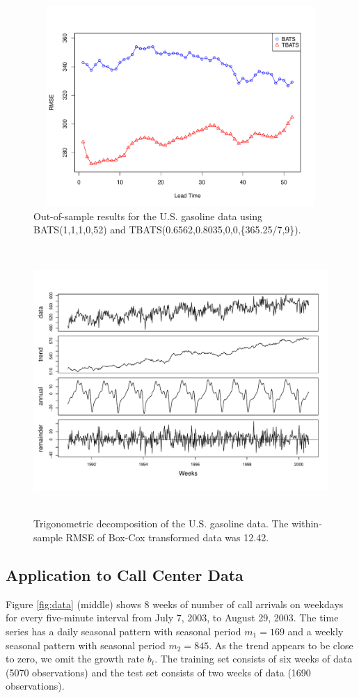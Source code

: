 \documentclass{uwstat572}
\begin{document}
\begin{figure}[]
\centering
  \includegraphics[width=6in,height=3in]{gasRMSE.pdf}
  \caption{Out-of-sample results for the U.S. gasoline data using BATS(1,1,1,0,52) and TBATS(0.6562,0.8035,0,0,\{365.25/7,9\}).}
  \label{fig:gasRMSE}
\end{figure}

\begin{figure}[]
\centering
  \includegraphics[width=\linewidth,height=4in]{tbatsDecompGas.pdf}
  \caption{Trigonometric decomposition of the U.S. gasoline data. The within-sample RMSE of Box-Cox transformed data was 12.42.}
  \label{fig:tbatsDecompGas}
\end{figure}


\subsection{Application to Call Center Data}
\hspace{4ex}Figure \ref{fig:data} (middle) shows 8 weeks of number of call arrivals on weekdays for every five-minute interval from July 7, 2003, to August 29, 2003. The time series has a daily seasonal pattern with seasonal period $m_1=169$ and a weekly seasonal pattern with seasonal period $m_2=845$. As the trend appears to be close to zero, we omit the growth rate $b_t$. The training set consists of six weeks of data (5070 observations) and the test set consists of two weeks of data (1690 observations). 
\end{document}
